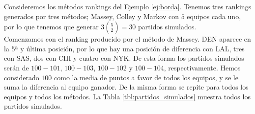 \begin{ejemplo} \label{ej:partidos_simulados}
Consideremos los métodos rankings del Ejemplo \ref{ej:borda}. Tenemos tres rankings generados por tres métodos; Massey, Colley y Markov con $5$ equipos cada uno, por lo que tenemos que generar $3\binom{5}{2} = 30$ partidos simulados. \\

Comenzamos con el ranking producido por el método de Massey. DEN aparece en la 5ª y última posición, por lo que hay una posición de diferencia con LAL, tres con SAS, dos con CHI y cuatro con NYK. De esta forma los partidos simulados serán de $100-101$, $100-103$, $100-102$ y $100-104$, respectivamente. Hemos considerado $100$ como la media de puntos a favor de todos los equipos, y se le suma la diferencia al equipo ganador. De la misma forma se repite para todos los equipos y todos los métodos. La Tabla \ref{tbl:partidos_simulados} muestra todos los partidos simulados. \\


\end{ejemplo}
